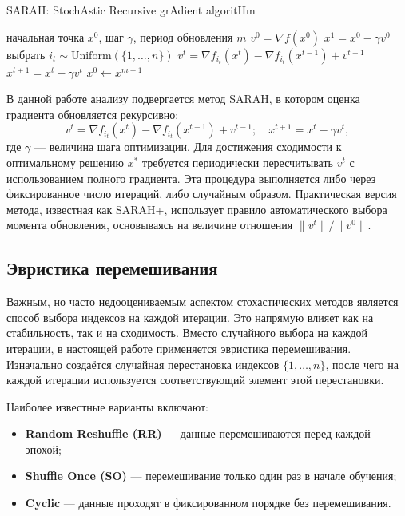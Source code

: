 \begin{algorithm}[H]
\caption{\textsc{SARAH}: StochAstic Recursive grAdient algoritHm}
\label{alg:sarah}
\begin{algorithmic}[1]
\Require начальная точка $x^0$, шаг $\gamma$, период обновления $m$
    \State $v^0 = \nabla f(x^0)$
    \State $x^1 = x^0 - \gamma v^0$
        \State выбрать $i_t \sim \mathrm{Uniform}(\{1, \dots, n\})$
        \State $v^t = \nabla f_{i_t}(x^t) - \nabla f_{i_t}(x^{t-1}) + v^{t-1}$
        \State $x^{t+1} = x^t - \gamma v^t$
    \EndFor
    \State $x^0 \gets x^{m+1}$ 
\EndFor
\end{algorithmic}
\end{algorithm}

\vspace{1ex}

В данной работе анализу подвергается метод \textsc{SARAH}, в котором оценка градиента обновляется рекурсивно:
\[
v^t = \nabla f_{i_t} (x^t) - \nabla f_{i_t} (x^{t-1}) + v^{t-1}; \quad x^{t+1} = x^t - \gamma v^t,
\]
где $\gamma$ — величина шага оптимизации. Для достижения сходимости к оптимальному решению $x^*$ требуется периодически пересчитывать $v^t$ с использованием полного градиента. Эта процедура выполняется либо через фиксированное число итераций, либо случайным образом. Практическая версия метода, известная как \textsc{SARAH+}, использует правило автоматического выбора момента обновления, основываясь на величине отношения $\|v^t\|/\|v^0\|$.

\subsection*{Эвристика перемешивания}

Важным, но часто недооцениваемым аспектом стохастических методов является способ выбора индексов на каждой итерации. Это напрямую влияет как на стабильность, так и на сходимость. Вместо случайного выбора на каждой итерации, в настоящей работе применяется эвристика перемешивания. Изначально создаётся случайная перестановка индексов \(\{1,\ldots,n\}\), после чего на каждой итерации используется соответствующий элемент этой перестановки.

Наиболее известные варианты включают:
\begin{itemize}
    \item \textbf{Random Reshuffle (RR)} — данные перемешиваются перед каждой эпохой;
    \item \textbf{Shuffle Once (SO)} — перемешивание только один раз в начале обучения;
    \item \textbf{Cyclic} — данные проходят в фиксированном порядке без перемешивания.
\end{itemize}

